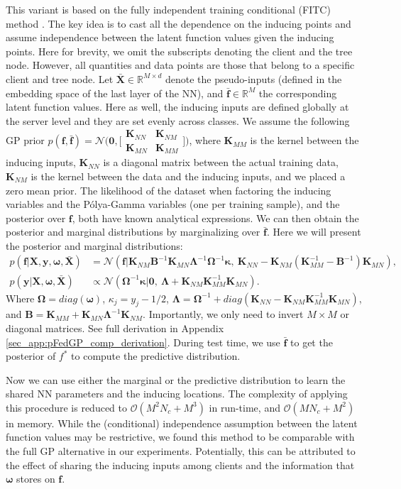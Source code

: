 \documentclass{article}
\newcommand{\normal}{\mathcal{N}}
\newcommand{\bld}[1]{\boldsymbol{#1}}
\def\rvf{{\mathbf{f}}}
\def\rvy{{\mathbf{y}}}
\def\rmB{{\mathbf{B}}}
\def\rmX{{\mathbf{X}}}
\def\sR{{\mathbb{R}}}
\newcommand{\pg}{P\'olya-Gamma }
\newcommand{\Knn}{\mathbf{K}_{NN}}
\newcommand{\Kmm}{\mathbf{K}_{MM}}
\newcommand{\Kmn}{\mathbf{K}_{MN}}
\newcommand{\Knm}{\mathbf{K}_{NM}}
\newcommand{\KmmInv}{\mathbf{K}_{MM}^{-1}}
\newcommand{\rvfbar}{\bar{\bld{\mathbf{f}}}}
\newcommand{\rvomega}{\bld{\mathbf{\omega}}}
\newcommand{\rvkappa}{\bld{\mathbf{\kappa}}}
\newcommand{\rmOmega}{\mathbf{\Omega}}
\newcommand{\rmOmegaInv}{\mathbf{\Omega}^{-1}}
\newcommand{\rmLambda}{\mathbf{\Lambda}}
\newcommand{\rmLambdaInv}{\mathbf{\Lambda}^{-1}}
\newcommand{\rmXbar}{\bar{\mathbf{\mathbf{X}}}}
\newcommand{\rmQInv}{\mathbf{B}^{-1}}
\begin{document}
This variant is based on the fully independent training conditional (FITC) method \cite{sneldon_Gharamani_IP}. The key idea is to cast all the dependence on the inducing points and assume independence between the latent function values given the inducing points. Here for brevity, we omit the subscripts denoting the client and the tree node. However, all quantities and data points are those that belong to a specific client and tree node. Let $\rmXbar \in \sR^{M\times d}$ denote the pseudo-inputs (defined in the embedding space of the last layer of the NN), and $\rvfbar \in \sR^{M}$ the corresponding latent function values. Here as well, the inducing inputs are defined globally at the server level and they are set evenly across classes.
We assume the following GP prior $p(\rvf, \rvfbar) = \normal\Big(\bld{0},\Big[\begin{matrix} \Knn & \Knm \\ \Kmn & \Kmm \end{matrix}\Big]\Big)$, where $\Kmm$ is the kernel between the inducing inputs, $\Knn$ is a diagonal matrix between the actual training data, $\Knm$ is the kernel between the data and the inducing inputs, and we placed a zero mean prior. The likelihood of the dataset when factoring the inducing variables and the \pg variables (one per training sample), and the posterior over $\rvf$, both have known analytical expressions. 
We can then obtain the posterior and marginal distributions by marginalizing over $\rvfbar$. Here we will present the posterior and marginal distributions:
\begin{align} \label{eq:IP-compute_posterior_f}
    p(\rvf | \rmX, \rvy, \rvomega, \rmXbar) &= \normal(\rvf | \Knm\rmQInv\Kmn\rmLambdaInv\rmOmegaInv\rvkappa,~\Knn - \Knm(\KmmInv - \rmQInv)\Kmn),\\
    p(\rvy | \rmX, \rvomega, \rmXbar) &\propto \normal(\rmOmegaInv\rvkappa | \bld{0},~\rmLambda + \Knm\KmmInv\Kmn).
\end{align}
Where $\rmOmega = diag(\rvomega)$, $\kappa_j = y_j - 1/2$, $\rmLambda = \rmOmegaInv + diag(\Knn - \Knm\KmmInv\Kmn)$, and $\rmB = \Kmm + \Kmn\rmLambdaInv\Knm$. Importantly, we only need to invert $M\times M$ or diagonal matrices. See full derivation in Appendix \ref{sec_app:pFedGP_comp_derivation}. During test time, we use $\rvfbar$ to get the posterior of $f^*$ to compute the predictive distribution. 

Now we can use either the marginal or the predictive distribution to learn the shared NN parameters and the inducing locations. The complexity of applying this procedure is reduced to $\mathcal{O}(M^2N_c + M^3)$ in run-time, and $\mathcal{O}(MN_c + M^2)$ in memory.
While the (conditional) independence assumption between the latent function values may be restrictive, we found this method to be comparable with the full GP alternative in our experiments. Potentially, this can be attributed to the effect of sharing the inducing inputs among clients and the information that $\rvomega$ stores on $\rvf$. 
\end{document}
